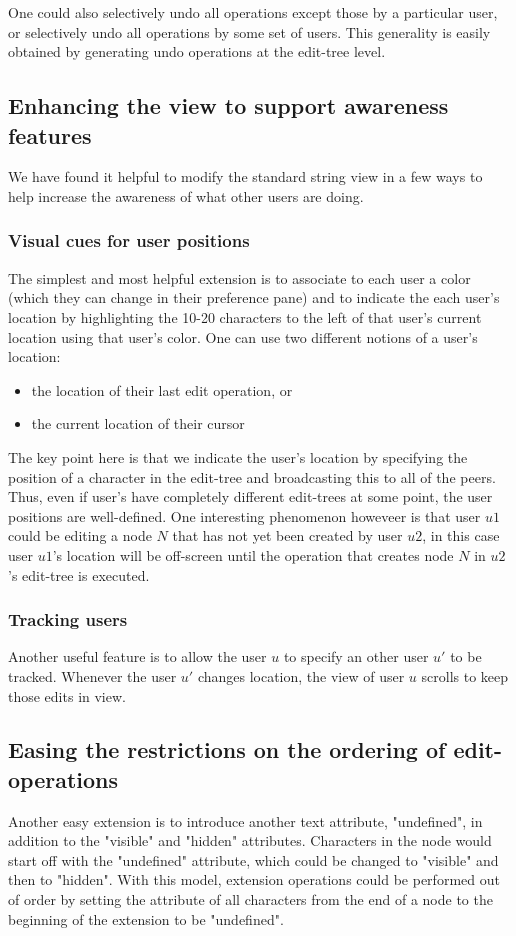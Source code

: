 \documentclass{amsart}
\begin{document}
One could also selectively undo all operations except those by a particular
user, or selectively undo all operations by some set of users. This generality
is easily obtained by generating undo operations at the edit-tree level.

\subsection{Enhancing the view to support awareness features}
We have found it helpful to modify the standard string view in a few
ways to help increase the awareness of what other users are doing. 

\subsubsection{Visual cues for user positions}
The simplest and most helpful extension is to associate to each user a
color (which they can change in their preference pane) and to indicate
the each user's location by highlighting the 10-20 characters to the left
of that user's current location using that user's color.  One can use two
different notions of a user's location:
\begin{itemize}
\item the location of their last edit operation, or
\item the current location of their cursor
\end{itemize}
The key point here is that we indicate the user's location by specifying
the position of a character in the edit-tree and broadcasting this to all
of the peers. Thus, even if user's have completely different edit-trees at
some point, the user positions are well-defined.  One interesting phenomenon
howeveer is that user $u1$ could be editing a node $N$ that has not yet
been created by user $u2$, in this case user $u1$'s location will be off-screen
until the operation that creates node $N$ in $u2$'s edit-tree is executed.

\subsubsection{Tracking users}
Another useful feature is to allow the user $u$ to specify an other user $u'$ to
be tracked. Whenever the user $u'$ changes location, the view of user $u$
scrolls to keep those edits in view.

\subsection{Easing the restrictions on the ordering of edit-operations}
Another easy extension is to introduce another text attribute, 
"undefined", in addition to the "visible" and "hidden" attributes. Characters
in the node would start off with the "undefined" attribute, which could be
changed to "visible" and then to "hidden".  With this model, extension
operations could be performed out of order by setting the attribute of
all characters from the end of a node to the beginning of the extension to
be "undefined".
\end{document}
